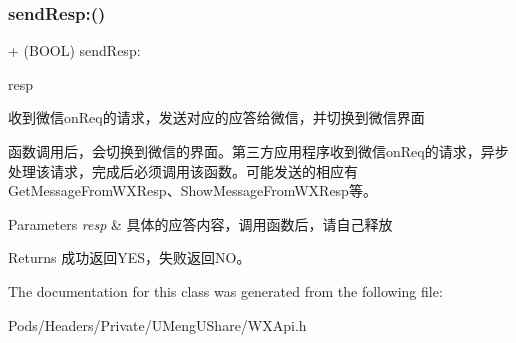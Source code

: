\subsubsection{\texorpdfstring{send\+Resp\+:()}{sendResp:()}\hspace{0.1cm}{\footnotesize\ttfamily [3/3]}}
{\footnotesize\ttfamily + (B\+O\+OL) send\+Resp\+: \begin{DoxyParamCaption}\item[{(\mbox{\hyperlink{interface_base_resp}{Base\+Resp}} $\ast$)}]{resp }\end{DoxyParamCaption}}



收到微信on\+Req的请求，发送对应的应答给微信，并切换到微信界面 

函数调用后，会切换到微信的界面。第三方应用程序收到微信on\+Req的请求，异步处理该请求，完成后必须调用该函数。可能发送的相应有 Get\+Message\+From\+W\+X\+Resp、\+Show\+Message\+From\+W\+X\+Resp等。 
\begin{DoxyParams}{Parameters}
{\em resp} & 具体的应答内容，调用函数后，请自己释放 \\
\hline
\end{DoxyParams}
\begin{DoxyReturn}{Returns}
成功返回\+Y\+E\+S，失败返回\+N\+O。 
\end{DoxyReturn}


The documentation for this class was generated from the following file\+:\begin{DoxyCompactItemize}
\item 
Pods/\+Headers/\+Private/\+U\+Meng\+U\+Share/W\+X\+Api.\+h\end{DoxyCompactItemize}
